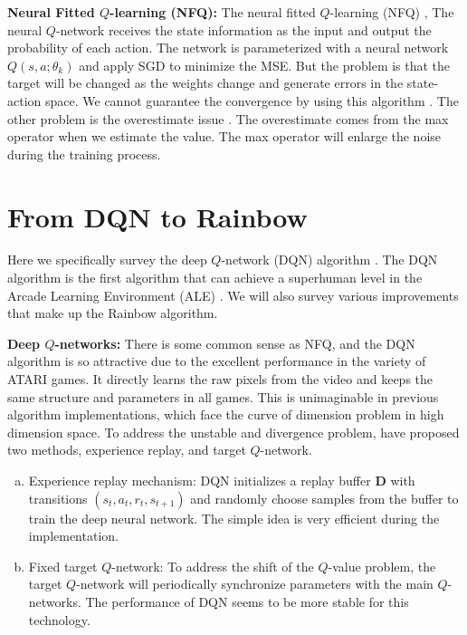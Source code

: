 \documentclass{article}
\begin{document}
{\bf Neural Fitted $Q$-learning (NFQ):}
The neural fitted $Q$-learning (NFQ) \citep{riedmiller2005neural}, The neural $Q$-network receives the state information as the input and output the probability of each action. The network is parameterized with a neural network $Q(s,a;\theta_k)$ and apply SGD to minimize the MSE. But the problem is that the target will be changed as the weights change and generate errors in the state-action space.  We cannot guarantee the convergence by using this algorithm \citep{baird1995residual, tsitsiklis1997analysis, gordon1996stable, riedmiller2005neural}. The other problem is the overestimate issue \citep{van2016deep}. The overestimate comes from the max operator when we estimate the value. The max operator will enlarge the noise during the training process.

%
\section{From DQN to Rainbow}
\label{sec:From DQN to Rainbow}

Here we specifically survey the deep $Q$-network (DQN) algorithm \citep{mnih2015human}. The DQN algorithm is the first algorithm that can achieve a superhuman level in the Arcade Learning Environment (ALE) \citep{bellemare2013arcade}. We will also survey various improvements that make up the Rainbow algorithm.

{\bf Deep $Q$-networks:}
There is some common sense as NFQ, and the DQN algorithm is so attractive due to the excellent performance in the variety of ATARI games. It directly learns the raw pixels from the video and keeps the same structure and parameters in all games.  This is unimaginable in previous algorithm implementations, which face the curve of dimension problem in high dimension space. 
To address the unstable and divergence problem, \citep{mnih2015human} have proposed two methods, experience replay, and target $Q$-network.

\begin{enumerate}[(a)]
	\item Experience replay mechanism: DQN initializes a replay buffer $\mathbf{D}$ with transitions $(s_t, a_t, r_t, s_{t+1})$ and randomly choose samples from the buffer to train the deep neural network. The simple idea is very efficient during the implementation.
	
	\item Fixed target $Q$-network: To address the shift of the $Q$-value problem, the target $Q$-network will periodically synchronize parameters with the main $Q$-networks. The performance of DQN seems to be more stable for this technology.
	
\end{enumerate}
\end{document}
